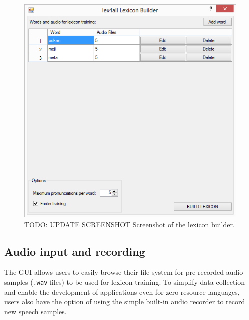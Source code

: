 \documentclass[11pt]{article}
\begin{document}
\begin{figure}[tb]
\begin{center}
\includegraphics[width=.9\columnwidth]{../screenshots/LexiconBuilder-Main-Filled.PNG}
\caption{TODO: UPDATE SCREENSHOT Screenshot of the lexicon builder.\label{fig:mainform}}
\end{center}
\end{figure}

\subsection{Audio input and recording}
\label{sec:recording}


The GUI allows users to easily browse their file system for pre-recorded audio samples (\texttt{.wav} files) to be used for lexicon training. 
To simplify data collection and enable the development of applications even for zero-resource languages, users also have the option of using the simple built-in audio recorder to record new speech samples.
\end{document}
